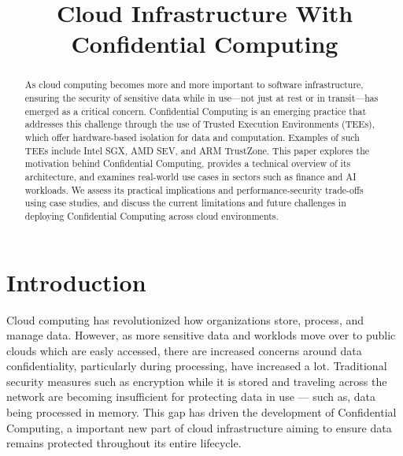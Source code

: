 \documentclass[conference]{IEEEtran}
\begin{document}
\title{Cloud Infrastructure With Confidential Computing}

\author{
}

\maketitle

\begin{abstract}
As cloud computing becomes more and more important to software infrastructure, 
ensuring the security of sensitive data while in use—not just at rest or in transit—has emerged 
as a critical concern. Confidential Computing is an emerging practice that addresses this challenge 
through the use of Trusted Execution Environments (TEEs), which offer hardware-based isolation for 
data and computation. Examples of such TEEs include Intel SGX\cite{intelSGX}, AMD SEV\cite{amdSEV}, 
and ARM TrustZone\cite{armTrustZone}. This paper 
explores the motivation behind Confidential Computing, provides a technical overview of its 
architecture, and examines real-world use cases in sectors such as finance and AI workloads. 
We assess 
its practical implications and performance-security trade-offs using case studies, and discuss the 
current limitations and future challenges in deploying Confidential Computing across cloud environments.
\end{abstract}

\section{Introduction}
Cloud computing has revolutionized how organizations store, process, and manage data. However, 
as more sensitive data and worklods move over to public clouds which are easly accessed, 
there are increased concerns around data 
confidentiality, particularly during processing, have increased a lot. Traditional security measures 
such as encryption while it is stored and traveling across the network 
are becoming insufficient for protecting data in use — such as, 
data being processed in memory. This gap has driven the development of Confidential Computing, 
a important new part of cloud infrastructure aiming to ensure data remains protected throughout its 
entire lifecycle.
\end{document}
